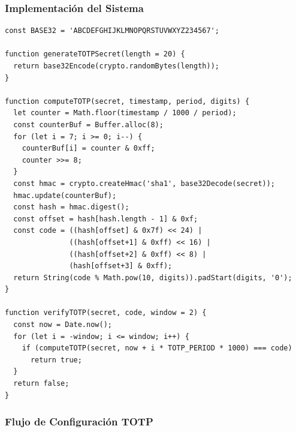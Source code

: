 \documentclass[12pt,a4paper,openany]{article}
\begin{document}
\subsubsection{Implementación del Sistema}

\begin{lstlisting}[style=jsstyle, caption={Implementación completa TOTP}]
const BASE32 = 'ABCDEFGHIJKLMNOPQRSTUVWXYZ234567';

function generateTOTPSecret(length = 20) {
  return base32Encode(crypto.randomBytes(length));
}

function computeTOTP(secret, timestamp, period, digits) {
  let counter = Math.floor(timestamp / 1000 / period);
  const counterBuf = Buffer.alloc(8);
  for (let i = 7; i >= 0; i--) {
    counterBuf[i] = counter & 0xff;
    counter >>= 8;
  }
  const hmac = crypto.createHmac('sha1', base32Decode(secret));
  hmac.update(counterBuf);
  const hash = hmac.digest();
  const offset = hash[hash.length - 1] & 0xf;
  const code = ((hash[offset] & 0x7f) << 24) |
               ((hash[offset+1] & 0xff) << 16) |
               ((hash[offset+2] & 0xff) << 8) |
               (hash[offset+3] & 0xff);
  return String(code % Math.pow(10, digits)).padStart(digits, '0');
}

function verifyTOTP(secret, code, window = 2) {
  const now = Date.now();
  for (let i = -window; i <= window; i++) {
    if (computeTOTP(secret, now + i * TOTP_PERIOD * 1000) === code)
      return true;
  }
  return false;
}
\end{lstlisting}

\subsubsection{Flujo de Configuración TOTP}
\end{document}
